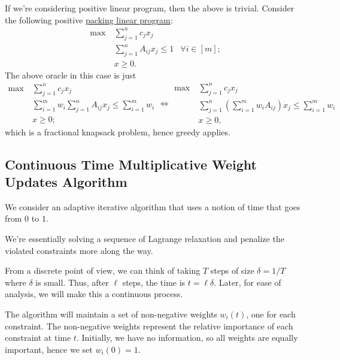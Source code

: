 \begin{remark}
	If we're considering positive linear program, then the above is trivial. Consider the following positive \hyperref[def:packing-LP]{packing linear program}:
	\[
		\begin{aligned}
			\max~ & \sum_{j=1}^{n} c_j x_j                                 \\
			      & \sum_{j=1}^{n} A_{ij} x_j \leq 1 & \forall i \in [m] ; \\
			      & x\geq 0.
		\end{aligned}
	\]
	The above oracle in this case is just
	\[
		\begin{aligned}
			\max~ & \sum_{j=1}^{n} c_j x_j                                               \\
			      & \sum_{i=1}^{m} w_i \sum_{j=1}^{n} A_{ij} x_j \leq \sum_{i=1}^{m} w_i \\
			      & x\geq 0;
		\end{aligned}
		\iff \begin{aligned}
			\max~ & \sum_{j=1}^{n} c_j x_j                                                              \\
			      & \sum_{j=1}^{n} \left( \sum_{i=1}^{m} w_i A_{ij} \right) x_j \leq \sum_{i=1}^{m} w_i \\
			      & x\geq 0,
		\end{aligned}
	\]
	which is a fractional knapsack problem, hence greedy applies.
\end{remark}

\subsection{Continuous Time Multiplicative Weight Updates Algorithm}
We consider an adaptive iterative algorithm that uses a notion of time that goes from \(0\) to \(1\).

\begin{intuition}
	We're essentially solving a sequence of Lagrange relaxation and penalize the violated constraints more along the way.
\end{intuition}

From a discrete point of view, we can think of taking \(T\) steps of size \(\delta = 1 / T\) where \(\delta \) is small. Thus, after \(\ell \) steps, the time is \(t = \ell \delta \). Later, for ease of analysis, we will make this a continuous process.

The algorithm will maintain a set of non-negative weights \(w_i(t)\), one for each constraint. The non-negative weights represent the relative importance of each constraint at time \(t\). Initially, we have no information, so all weights are equally important, hence we set \(w_i(0) = 1\).

